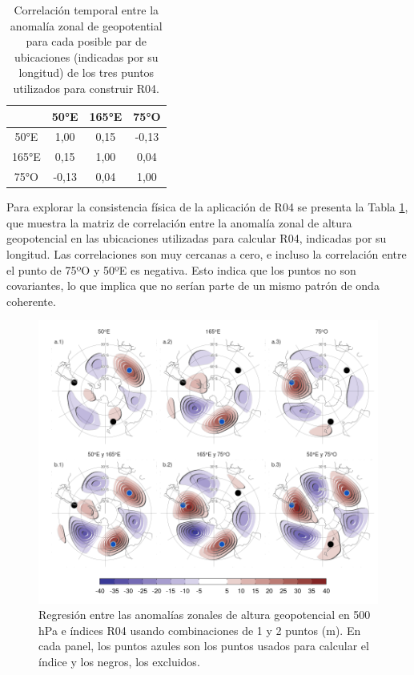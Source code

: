 \documentclass[12pt,oneside,a4paper]{reedthesis}
\begin{document}
\begin{table}

\caption{\label{tab:raphael-correlation}Correlación temporal entre la anomalía zonal de geopotential para cada posible par de ubicaciones (indicadas por su longitud) de los tres puntos utilizados para construir R04.}
\centering
\begin{tabular}[t]{cccc}
\toprule
 & 50°E & 165°E & 75°O\\
\midrule
50°E & 1,00 & 0,15 & -0,13\\
165°E & 0,15 & 1,00 & 0,04\\
75°O & -0,13 & 0,04 & 1,00\\
\bottomrule
\end{tabular}
\end{table}

Para explorar la consistencia física de la aplicación de R04 se presenta la Tabla \ref{tab:raphael-correlation}, que muestra la matriz de correlación entre la anomalía zonal de altura geopotencial en las ubicaciones utilizadas para calcular R04, indicadas por su longitud.
Las correlaciones son muy cercanas a cero, e incluso la correlación entre el punto de 75ºO y 50ºE es negativa.
Esto indica que los puntos no son covariantes, lo que implica que no serían parte de un mismo patrón de onda coherente.

\begin{figure}

{\centering \includegraphics{figures/15-onda3/cor-puntos-1} 

}

\caption{Regresión entre las anomalías zonales de altura geopotencial en 500 hPa e índices R04 usando combinaciones de 1 y 2 puntos (m). En cada panel, los puntos azules son los puntos usados para calcular el índice y los negros, los excluidos.}\label{fig:cor-puntos}
\end{figure}
\end{document}
